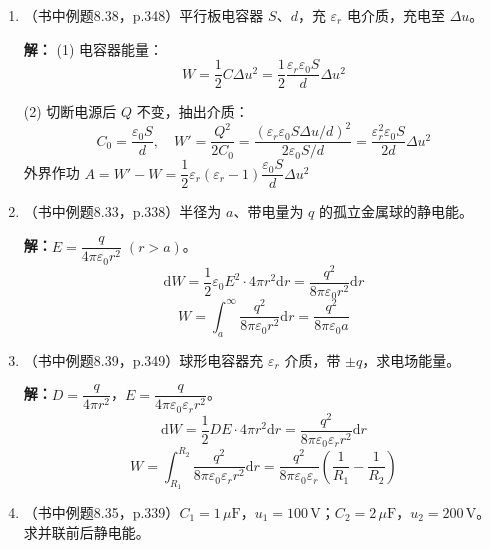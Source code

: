 \documentclass{ctexart}
\begin{document}
\begin{enumerate}
\textbf{解：}取 $dq = \lambda\mathrm{d}x$，变换变量 $x = -a\cot\theta$，$\mathrm{d}x = a\csc^{2}\theta\mathrm{d}\theta$。
\[
E_x = \frac{\lambda}{4\pi\varepsilon_0 a}\int_{\theta_1}^{\theta_2}\cos\theta\mathrm{d}\theta
= \frac{\lambda}{4\pi\varepsilon_0 a}(\sin\theta_2 - \sin\theta_1)
\]
\[
E_y = \frac{\lambda}{4\pi\varepsilon_0 a}\int_{\theta_1}^{\theta_2}\sin\theta\mathrm{d}\theta
= \frac{\lambda}{4\pi\varepsilon_0 a}(\cos\theta_1 - \cos\theta_2)
\]
无限长直线（$\theta_1 = -\pi/2,\;\theta_2 = \pi/2$）：$E_x = 0$，$E_y = \dfrac{\lambda}{2\pi\varepsilon_0 a}$

\item（书中例题8.38，p.348）平行板电容器 $S$、$d$，充 $\varepsilon_r$ 电介质，充电至 $\Delta u$。

\textbf{解：}
(1) 电容器能量：
\[
W = \frac12 C\Delta u^{2} = \frac12 \frac{\varepsilon_r\varepsilon_0 S}{d}\Delta u^{2}
\]

(2) 切断电源后 $Q$ 不变，抽出介质：
\[
C_0 = \frac{\varepsilon_0 S}{d},\quad
W' = \frac{Q^{2}}{2C_0} = \frac{(\varepsilon_r\varepsilon_0 S\Delta u/d)^{2}}{2\varepsilon_0 S/d}
= \frac{\varepsilon_r^{2}\varepsilon_0 S}{2d}\Delta u^{2}
\]
外界作功 $A = W' - W = \dfrac12 \varepsilon_r(\varepsilon_r - 1)\dfrac{\varepsilon_0 S}{d}\Delta u^{2}$

\item（书中例题8.33，p.338）半径为 $a$、带电量为 $q$ 的孤立金属球的静电能。

\textbf{解：}$E = \dfrac{q}{4\pi\varepsilon_0 r^{2}}\;(r > a)$。
\[
\mathrm{d}W = \frac12\varepsilon_0 E^{2}\cdot 4\pi r^{2}\mathrm{d}r
= \frac{q^{2}}{8\pi\varepsilon_0 r^{2}}\mathrm{d}r
\]
\[
W = \int_a^{\infty} \frac{q^{2}}{8\pi\varepsilon_0 r^{2}}\mathrm{d}r = \frac{q^{2}}{8\pi\varepsilon_0 a}
\]

\item（书中例题8.39，p.349）球形电容器充 $\varepsilon_r$ 介质，带 $\pm q$，求电场能量。

\textbf{解：}$D = \dfrac{q}{4\pi r^{2}}$，$E = \dfrac{q}{4\pi\varepsilon_0\varepsilon_r r^{2}}$。
\[
\mathrm{d}W = \frac12 DE\cdot 4\pi r^{2}\mathrm{d}r
= \frac{q^{2}}{8\pi\varepsilon_0\varepsilon_r r^{2}}\mathrm{d}r
\]
\[
W = \int_{R_1}^{R_2} \frac{q^{2}}{8\pi\varepsilon_0\varepsilon_r r^{2}}\mathrm{d}r
= \frac{q^{2}}{8\pi\varepsilon_0\varepsilon_r}\left(\frac{1}{R_1} - \frac{1}{R_2}\right)
\]

\item（书中例题8.35，p.339）$C_1 = 1\,\mu\text{F}$，$u_1 = 100\,\text{V}$；$C_2 = 2\,\mu\text{F}$，$u_2 = 200\,\text{V}$。求并联前后静电能。


\end{enumerate}
\end{document}
